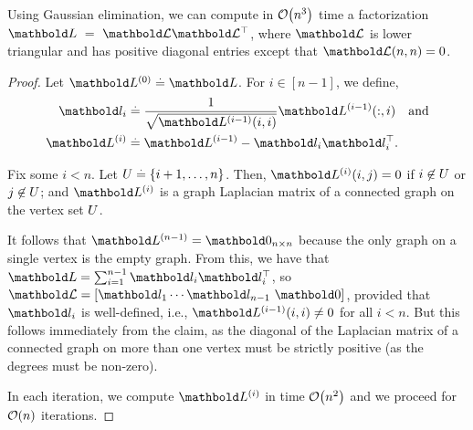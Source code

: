 \begin{thm} Using Gaussian elimination, we can compute in $\LandauO{n^3}$ time a factorization $\mL~=~\mCalL\trans{\mCalL}$, where $\mCalL$ is lower triangular and has positive diagonal entries except that $\mCalL(n,n) = 0$.
\end{thm}
\begin{proof}
Let $\mL^{(0)} \defeq \mL$. For $i \in [n-1]$, we define, \begin{align*}
    \vl_i &\defeq \frac{1}{\sqrt{\mL^{(i-1)}(i,i)}}\mL^{(i-1)}(:,i) \quad\text{and} \\
    \mL^{(i)} &\defeq \mL^{(i-1)} - \vl_i \trans{\vl_i}.
\end{align*}

\begin{clm}\label{clm:cholesky_decomp_intermediate_laplacians}
Fix some $i < n$. Let $U \overset{.}{=} \{i+1, \dots, n\}$. Then, $\mL^{(i)}(i,j) = 0$ if $i \not\in U$ or $j \not\in U$; and $\mL^{(i)}$ is a graph Laplacian matrix of a connected graph on the vertex set $U$.
\end{clm}

It follows that $\mL^{(n-1)} = \mZero_{n \times n}$ because the only graph on a single vertex is the empty graph. From this, we have that $\mL = \sum_{i=1}^{n-1} \vl_i \trans{\vl_i}$, so $\mCalL = [\vl_1 \cdots \vl_{n-1}\ \vZero]$, provided that $\vl_i$ is well-defined, i.e., $\mL^{(i-1)}(i,i) \neq 0$ for all $i < n$. But this follows immediately from the claim, as the diagonal of the Laplacian matrix of a connected graph on more than one vertex must be strictly positive (as the degrees must be non-zero).

In each iteration, we compute $\mL^{(i)}$ in time $\LandauO{n^2}$ and we proceed for $\LandauO{n}$ iterations.
\end{proof}

